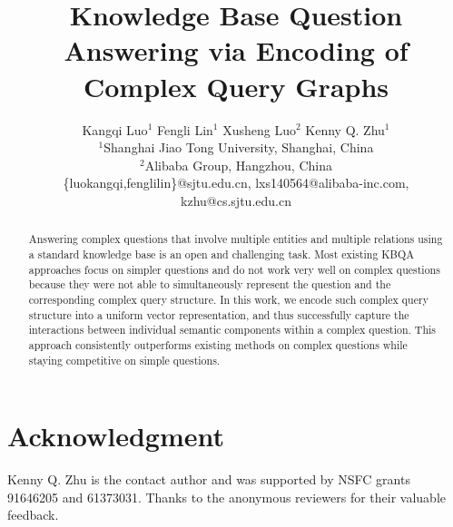 \documentclass[11pt,a4paper]{article}
\title{Knowledge Base Question Answering via Encoding of
\\Complex Query Graphs}
\author{
 Kangqi Luo$^1$ \hspace*{1cm}
 Fengli Lin$^1$  \hspace*{1cm}
 Xusheng Luo$^2$  \hspace*{1cm}
 Kenny Q. Zhu$^1$ 
 \\ 
 $^1$Shanghai Jiao Tong University, Shanghai, China \\
 $^2$Alibaba Group, Hangzhou, China \\
 \{luokangqi,fenglilin\}@sjtu.edu.cn,
 lxs140564@alibaba-inc.com,
 kzhu@cs.sjtu.edu.cn
 }
\date{}
\begin{document}
\maketitle
\begin{abstract}
Answering complex questions that involve multiple entities and
multiple relations using a standard knowledge base is an open and 
challenging task. Most existing KBQA approaches focus on
simpler questions and do not work very well on complex questions
because they were not able to simultaneously represent the question
and the corresponding complex query structure.
In this work, we encode such complex query structure into a uniform vector 
representation, and thus successfully capture the interactions between
individual semantic components within a complex question. This approach
consistently outperforms existing methods on complex questions while
staying competitive on simple questions.
\end{abstract}



%








\section*{Acknowledgment}
Kenny Q. Zhu is the contact author and was supported by NSFC grants
91646205 and 61373031. Thanks to the anonymous reviewers for their valuable
feedback.



\end{document}
